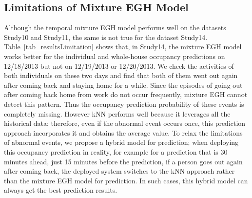\subsection{Limitations of Mixture EGH Model}
Although the temporal mixture EGH model performs well on the datasets Study10 and Study11, 
the same is not true for the dataset Study14. 
Table~\ref{tab_resultsLimitation} shows that, 
in Study14, 
the mixture EGH model works better for the individual and whole-house occupancy predictions on 12/18/2013 but not on 12/19/2013 or 12/20/2013. 
We check the activities of both individuals on these two days 
and find that both of them went out again 
after coming back and staying home for a while.
Since the episodes of going out after coming back home from work 
do not occur frequently, mixture EGH cannot detect this pattern. Thus the occupancy prediction probability of these events 
is completely missing. However kNN performs well because it leverages all the 
historical data; therefore, even if the abnormal event occurs once, 
this prediction approach incorporates it and obtains the average value. 
To relax the limitations of abnormal events, 
we propose a hybrid model for prediction;
when deploying this occupancy prediction in reality, 
for example for a prediction that is 30 minutes ahead, 
just 15 minutes before the prediction, if a person goes out again after coming back, 
the deployed system switches to the kNN approach rather than the mixture EGH model for prediction. In such cases, this hybrid model can always get the best prediction results. 

